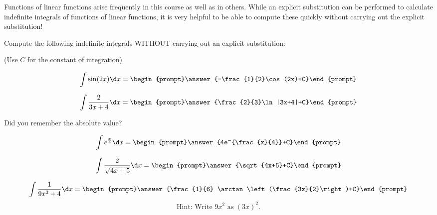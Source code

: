 \documentclass{ximera}
\author{Jim Talamo}
\begin{document}
\begin{exercise}

Functions of linear functions arise frequently in this course as well as in others.  While an explicit substitution can be performed to calculate indefinite integrals of functions of linear functions, it is very helpful to be able to compute these quickly without carrying out the explicit substitution!  

Compute the following indefinite integrals WITHOUT carrying out an explicit substitution:

\begin{prompt} (Use $C$ for the constant of integration) \end{prompt}

\[\int \sin(2x) \d x = \begin{prompt}\answer{-\frac{1}{2}\cos(2x)+C}\end{prompt}\]

\[\int \frac{2}{3x+4} \d x = \begin{prompt}\answer{\frac{2}{3}\ln|3x+4|+C}\end{prompt}\]

\begin{hint}
Did you remember the absolute value?
\end{hint}

\[\int e^{\frac{x}{4}} \d x = \begin{prompt}\answer{4e^{\frac{x}{4}}+C}\end{prompt}\]

\[\int \frac{2}{\sqrt{4x+5}} \d x = \begin{prompt}\answer{\sqrt{4x+5}+C}\end{prompt}\]

\[\int \frac{1}{9x^2+4} \d x = \begin{prompt}\answer{\frac{1}{6} \arctan\left(\frac{3x}{2}\right)+C}\end{prompt}\]
\[\mbox{Hint: Write $9x^2$ as $(3x)^2$.}\]





\end{exercise}
\end{document}
